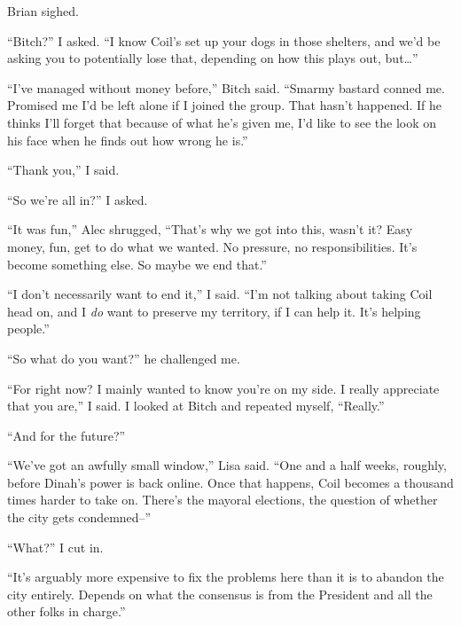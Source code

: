Brian sighed.



``Bitch?'' I asked.  ``I know Coil's set up your dogs in those shelters, and we'd be asking you to potentially lose that, depending on how this plays out, but\ldots''



``I've managed without money before,'' Bitch said.  ``Smarmy bastard conned me.  Promised me I'd be left alone if I joined the group.  That hasn't happened.  If he thinks I'll forget that because of what he's given me, I'd like to see the look on his face when he finds out how wrong he is.''



``Thank you,'' I said.



``So we're all in?'' I asked.



``It was fun,'' Alec shrugged, ``That's why we got into this, wasn't it?  Easy money, fun, get to do what we wanted.  No pressure, no responsibilities.  It's become something else.  So maybe we end that.''



``I don't necessarily want to end it,'' I said.  ``I'm not talking about taking Coil head on, and I \emph{do} want to preserve my territory, if I can help it.  It's helping people.''



``So what do you want?'' he challenged me.



``For right now?  I mainly wanted to know you're on my side.  I really appreciate that you are,'' I said.  I looked at Bitch and repeated myself, ``Really.''



``And for the future?''



``We've got an awfully small window,'' Lisa said.  ``One and a half weeks, roughly, before Dinah's power is back online.  Once that happens, Coil becomes a thousand times harder to take on.  There's the mayoral elections, the question of whether the city gets condemned--''



``What?'' I cut in.



``It's arguably more expensive to fix the problems here than it is to abandon the city entirely.  Depends on what the consensus is from the President and all the other folks in charge.''



